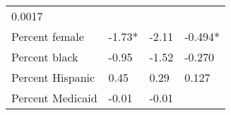 \documentclass[
]{book}
\begin{document}
\begin{longtable}[]{@{}llll@{}}
\begin{minipage}[t]{0.21\columnwidth}
0.0017\strut
\end{minipage}\tabularnewline
\begin{minipage}[t]{0.17\columnwidth}\raggedright
Percent female\strut
\end{minipage} & \begin{minipage}[t]{0.25\columnwidth}\raggedright
-1.73*\strut
\end{minipage} & \begin{minipage}[t]{0.25\columnwidth}\raggedright
-2.11\strut
\end{minipage} & \begin{minipage}[t]{0.21\columnwidth}\raggedright
-0.494*\strut
\end{minipage}\tabularnewline
\begin{minipage}[t]{0.17\columnwidth}\raggedright
Percent black\strut
\end{minipage} & \begin{minipage}[t]{0.25\columnwidth}\raggedright
-0.95\strut
\end{minipage} & \begin{minipage}[t]{0.25\columnwidth}\raggedright
-1.52\strut
\end{minipage} & \begin{minipage}[t]{0.21\columnwidth}\raggedright
-0.270\strut
\end{minipage}\tabularnewline
\begin{minipage}[t]{0.17\columnwidth}\raggedright
Percent Hispanic\strut
\end{minipage} & \begin{minipage}[t]{0.25\columnwidth}\raggedright
0.45\strut
\end{minipage} & \begin{minipage}[t]{0.25\columnwidth}\raggedright
0.29\strut
\end{minipage} & \begin{minipage}[t]{0.21\columnwidth}\raggedright
0.127\strut
\end{minipage}\tabularnewline
\begin{minipage}[t]{0.17\columnwidth}\raggedright
Percent Medicaid\strut
\end{minipage} & \begin{minipage}[t]{0.25\columnwidth}\raggedright
-0.01\strut
\end{minipage} & \begin{minipage}[t]{0.25\columnwidth}\raggedright
-0.01\strut
\end{minipage} & \begin{minipage}[t]{0.21\columnwidth}\raggedright

\end{minipage}
\end{longtable}
\end{document}
